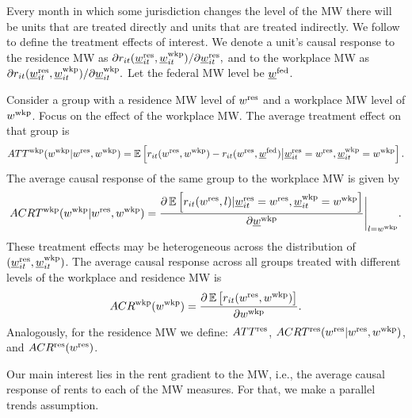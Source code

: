 Every month in which some jurisdiction changes the level of the MW there will 
be units that are treated directly and units that are treated indirectly.
We follow \textcite{AngristImbens1995, CallawayEtAl2021} to define the 
treatment effects of interest.
We denote a unit's causal response to the residence MW as
$\partial r_{it}(\underline{w}_{it}^{\text{res}}, \underline{w}_{it}^{\text{wkp}})/\partial \underline{w}_{it}^{\text{res}} ,$
and to the workplace MW as 
$\partial r_{it}(\underline{w}_{it}^{\text{res}}, \underline{w}_{it}^{\text{wkp}})/\partial \underline{w}_{it}^{\text{wkp}} .$
Let the federal MW level be $\underline{w}^{\text{fed}}$.

\begin{definition}\label{def:treatment_effects}
    Consider a group with a residence MW level of $w^{\text{res}}$ and a workplace
    MW level of $w^{\text{wkp}}$.
    Focus on the effect of the workplace MW.
    The average treatment effect on that group is
    \begin{equation*}
        ATT^{\text{wkp}}(w^{\text{wkp}} | w^{\text{res}}, w^{\text{wkp}}) 
            = \operatorname{\mathbb{E}}\left[r_{it}(w^{\text{res}}, w^{\text{wkp}}) - r_{it}(w^{\text{res}}, \underline{w}^{\text{fed}}) 
                    \big| \underline{w}_{it}^{\text{res}}=w^{\text{res}}, \underline{w}_{it}^{\text{wkp}}=w^{\text{wkp}}\right] .
    \end{equation*}
    The average causal response of the same group to the workplace MW is given by
    \begin{equation*}
        ACRT^{\text{wkp}}(w^{\text{wkp}} | w^{\text{res}}, w^{\text{wkp}}) 
            = \frac{\partial \operatorname{\mathbb{E}}\left[r_{it}(w^{\text{res}}, l) | \underline{w}_{it}^{\text{res}}=w^{\text{res}}, \underline{w}_{it}^{\text{wkp}}=w^{\text{wkp}}\right]}
                    {\partial \underline{w}^{\text{wkp}}} \Bigg|_{l=w^{\text{wkp}}} .
    \end{equation*}
    These treatment effects may be heterogeneous across the distribution 
    of $(\underline{w}_{it}^{\text{res}},\underline{w}_{it}^{\text{wkp}})$.
    The average causal response across all groups treated with different 
    levels of the workplace and residence MW is
    \begin{equation*}
        ACR^{\text{wkp}}(w^{\text{wkp}}) = \frac{\partial \operatorname{\mathbb{E}}\left[r_{it}(w^{\text{res}}, w^{\text{wkp}}) \right] }
                                    {\partial w^{\text{wkp}}} .
    \end{equation*}
    Analogously, for the residence MW we define: $ATT^{\text{res}}$, 
    $ACRT^{\text{res}}(w^{\text{res}} | w^{\text{res}}, w^{\text{wkp}})$, and $ACR^{\text{res}}(w^{\text{res}})$.
\end{definition}

Our main interest lies in the rent gradient to the MW, i.e., the 
average causal response of rents to each of the MW measures.
For that, we make a parallel trends assumption.

